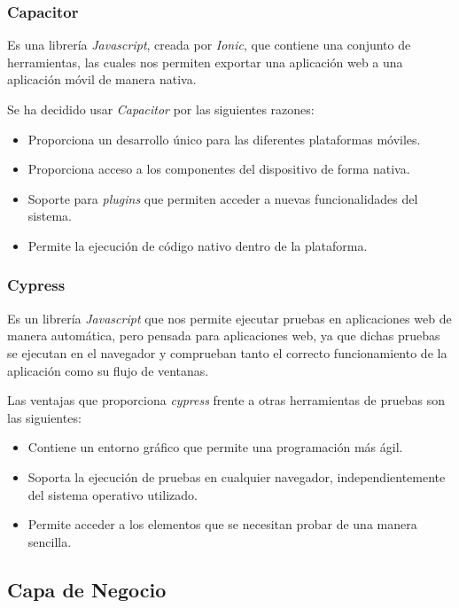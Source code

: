 \subsubsection{Capacitor~\cite{capacitor}}
Es una librería \textit{Javascript}, creada por \textit{Ionic}, que contiene una conjunto de herramientas, las cuales nos permiten exportar una aplicación web a una aplicación móvil de manera nativa.

Se ha decidido usar \textit{Capacitor} por las siguientes razones:
\begin{itemize}
    \item Proporciona un desarrollo único para las diferentes plataformas móviles.
    \item Proporciona acceso a los componentes del dispositivo de forma nativa.
    \item Soporte para \textit{plugins} que permiten acceder a nuevas funcionalidades del sistema.
    \item Permite la ejecución de código nativo dentro de la plataforma.

\end{itemize}

\subsubsection{Cypress~\cite{cypress}}

Es un librería \textit{Javascript} que nos permite ejecutar pruebas en aplicaciones web de manera automática, pero pensada para aplicaciones web, ya que dichas pruebas se ejecutan en el navegador y comprueban tanto el correcto funcionamiento de la aplicación como su flujo de ventanas. 

Las ventajas que proporciona \textit{cypress} frente a otras herramientas de pruebas son las siguientes:
\begin{itemize}
    \item Contiene un entorno gráfico que permite una programación más ágil.
    \item Soporta la ejecución de pruebas en cualquier navegador, independientemente del sistema operativo utilizado.
    \item Permite acceder a los elementos que se necesitan probar de una manera sencilla.
\end{itemize}



\subsection{Capa de Negocio}

